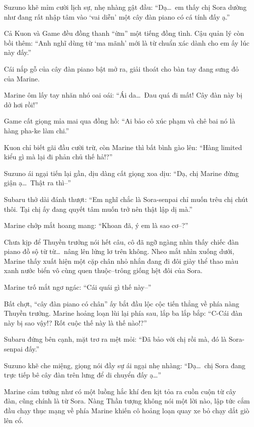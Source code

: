 \documentclass[../main.tex]{subfiles}
\begin{document}

Suzuno khẽ mỉm cười lịch sự, nhẹ nhàng gật đầu: ``Dạ\dots\ em thấy chị Sora dường như đang rất nhập tâm vào `vai diễn' một cây đàn piano có cá tính đấy ạ.''

Cả Kuon và Game đều đồng thanh ``ừm'' một tiếng đồng tình. Cậu quản lý còn bồi thêm: ``Anh nghĩ dùng từ `ma mãnh' mới là từ chuẩn xác dành cho em ấy lúc này đấy.''

\omk

Cái nắp gỗ của cây đàn piano bật mở ra, giải thoát cho bàn tay đang sưng đỏ của Marine.

Marine ôm lấy tay nhăn nhó oai oái: ``Ái da\dots\ Đau quá đi mất! Cây đàn này bị dở hơi rồi!''

Game cất giọng mỉa mai qua đồng hồ: ``Ai bảo cô xúc phạm và chê bai nó là hàng pha-ke làm chi.''

Kuon chỉ biết gãi đầu cười trừ, còn Marine thì bất bình gào lên: ``Hàng limited kiểu gì mà lại đi phản chủ thế hả!?''

Suzuno ái ngại tiến lại gần, dịu dàng cất giọng xoa dịu: ``Dạ, chị Marine đừng giận ạ\dots\ Thật ra thì--''

Subaru thở dài đánh thượt: ``Em nghĩ chắc là Sora-senpai chỉ muốn trêu chị chút thôi. Tại chị ấy đang quyết tâm muốn trở nên thật lập dị mà.''

Marine chớp mắt hoang mang: ``Khoan đã, ý em là sao cơ--?''

Chưa kịp để Thuyền trưởng nói hết câu, cô đã ngỡ ngàng nhìn thấy chiếc đàn piano đồ sộ từ từ\dots\ nâng lên lửng lơ trên không. Nheo mắt nhìn xuống dưới, Marine thấy xuất hiện một cặp chân nhỏ nhắn đang đi đôi giày thể thao màu xanh nước biển vô cùng quen thuộc--trông giống hệt đôi của Sora.

Marine trố mắt ngơ ngác: ``Cái quái gì thế này--''

Bất chợt, ``cây đàn piano có chân'' ấy bắt đầu lộc cộc tiến thẳng về phía nàng Thuyền trưởng. Marine hoảng loạn lùi lại phía sau, lắp ba lắp bắp: ``C-Cái đàn này bị sao vậy!? Rốt cuộc thế này là thế nào!?''

Subaru đứng bên cạnh, mặt trơ ra mệt mỏi: ``Đã bảo với chị rồi mà, đó là Sora-senpai đấy.''

Suzuno khẽ che miệng, giọng nói đầy sự ái ngại nhẹ nhàng: ``Dạ\dots\ chị Sora đang trực tiếp bê cây đàn trên lưng để di chuyển đấy ạ\dots''

Marine cảm tưởng như có một luồng hắc khí đen kịt tỏa ra cuồn cuộn từ cây đàn, cũng chính là từ Sora. Nàng Thần tượng không nói một lời nào, lập tức cắm đầu chạy thục mạng về phía Marine khiến cô hoảng loạn quay xe bỏ chạy dắt giò lên cổ.
\end{document}
